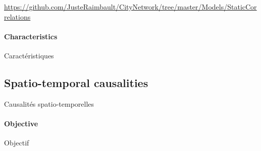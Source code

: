 \url{https://github.com/JusteRaimbault/CityNetwork/tree/master/Models/StaticCorrelations}

\paragraph{Characteristics}{Caractéristiques}












\subsection{Spatio-temporal causalities}{Causalités spatio-temporelles}

\paragraph{Objective}{Objectif}

